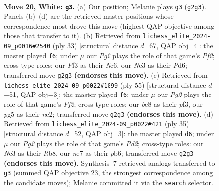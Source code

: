 \documentclass[11pt]{article}
\begin{document}
\begin{figure}[p]
\label{fig:thought-m36}
\end{figure}

\clearpage

\begin{figure}[p]\centering
\begin{subfigure}{0.46\textwidth}\centering
\resizebox{\linewidth}{!}{%
\newchessgame
\chessboard[
  setfen={r1b3k1/ppppn3/7p/5pp1/8/1PN2P2/P1PPB1PP/R5K1 w - - 0 20},
  showmover=false,
  pgfstyle=straightmove, color=movearrow, markmove={g2-g3}
]}
\caption{}
\end{subfigure}\hfill
\begin{subfigure}{0.46\textwidth}\centering
\resizebox{\linewidth}{!}{%
\newchessgame
\chessboard[
  setfen={r5k1/ppp2ppp/2np4/8/8/2PNP2P/PPP3P1/2K4R b - - 0 17},
  showmover=false,
  pgfstyle=straightmove, color=movearrow, markmove={f7-f6}
]}
\caption{}
\end{subfigure}
\\[4pt]
\begin{subfigure}{0.46\textwidth}\centering
\resizebox{\linewidth}{!}{%
\newchessgame
\chessboard[
  setfen={2r3k1/pp3ppp/1bn1p3/8/1P2P3/5PP1/P1NBK2P/1R6 b - - 2 28},
  showmover=false,
  pgfstyle=straightmove, color=movearrow, markmove={f7-f6}
]}
\caption{}
\end{subfigure}\hfill
\begin{subfigure}{0.46\textwidth}\centering
\resizebox{\linewidth}{!}{%
\newchessgame
\chessboard[
  setfen={1rb1k2r/3p1ppp/pP2p3/8/N3P3/P7/1P3PPP/2K2B1R b k - 2 18},
  showmover=false,
  pgfstyle=straightmove, color=movearrow, markmove={d7-d6}
]}
\caption{}
\end{subfigure}
\caption{\textbf{Move 20, White: \texttt{g3}.} (a) Our position; Melanie plays \texttt{g3} (\texttt{g2g3}). Panels (b)--(d) are the retrieved master positions whose correspondence most drove this move (highest QAP objective among those that transfer to it). (b) Retrieved from \texttt{lichess\_elite\_2024-09\_p0016\#2540} (ply 33) [structural distance $d$=67, QAP obj=4]: the master played \texttt{f6}; under $\mu$ our \emph{Pg2} plays the role of that game's \emph{Pf2}; cross-type roles: our \emph{P}f3 as their \emph{N}c6, our \emph{N}c3 as their \emph{P}d6; transferred move \texttt{g2g3} \textbf{(endorses this move)}. (c) Retrieved from \texttt{lichess\_elite\_2024-09\_p0022\#1099} (ply 55) [structural distance $d$=51, QAP obj=3]: the master played \texttt{f6}; under $\mu$ our \emph{Pg2} plays the role of that game's \emph{Pf2}; cross-type roles: our \emph{b}c8 as their \emph{p}f3, our \emph{p}g5 as their \emph{n}c2; transferred move \texttt{g2g3} \textbf{(endorses this move)}. (d) Retrieved from \texttt{lichess\_elite\_2024-09\_p0022\#421} (ply 35) [structural distance $d$=52, QAP obj=3]: the master played \texttt{d6}; under $\mu$ our \emph{Pg2} plays the role of that game's \emph{Pd2}; cross-type roles: our \emph{N}c3 as their \emph{R}b8, our \emph{n}e7 as their \emph{p}b6; transferred move \texttt{g2g3} \textbf{(endorses this move)}. Synthesis: 7 retrieved analogs transferred to \texttt{g3} (summed QAP objective 23, the strongest correspondence among the candidate moves); Melanie committed it via the \texttt{search} selector.}

\end{figure}
\end{document}
